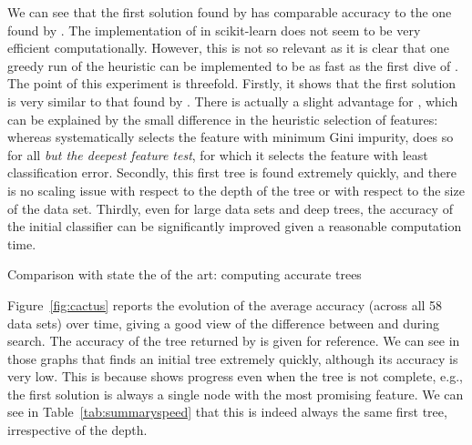 \documentclass{article}
\begin{document}
We can see that the first solution found by \budalg has comparable accuracy to the one found by \cart. The implementation of \cart in scikit-learn does not seem to be very efficient computationally. However, this is not so relevant as it is clear that one greedy run of the heuristic can be implemented to be as fast as the first dive of \budalg. The point of this experiment is threefold. Firstly, it shows that the first solution is very similar to that found by \cart. There is actually a slight advantage for \budalg, which can
be explained by the small difference in the heuristic selection of features: whereas \cart systematically selects the feature with minimum Gini impurity, \budalg does so for all \emph{but the deepest feature test}, for which it selects the feature with least classification error. 
Secondly, this first tree
is found extremely quickly, and there is no scaling issue with respect to the depth of the tree or with respect to the size of the data set. Thirdly, even for large data sets and deep trees, the accuracy of the initial classifier can be significantly improved given a reasonable computation time.




\begin{table}[htbp]
\begin{center}
\begin{footnotesize}
\tabcolsep=5pt

\end{footnotesize}
\end{center}
\caption{\label{tab:summaryspeed} Comparison with state the of the art: computing accurate trees}
\end{table}


Figure~\ref{fig:cactus} reports the evolution of the average accuracy (across all 58 data sets) over time, giving a good view of the difference between \murtree and \budalg during search. The accuracy of the tree returned by \cart is given for reference. 
We can see in those graphs that \murtree finds an initial tree extremely quickly, although its accuracy is very low. This is because \murtree shows progress even when the tree is not complete, e.g., the first solution is always a single node with the most promising feature. We can see in Table~\ref{tab:summaryspeed} that this is indeed always the same first tree, irrespective of the depth.
\end{document}
